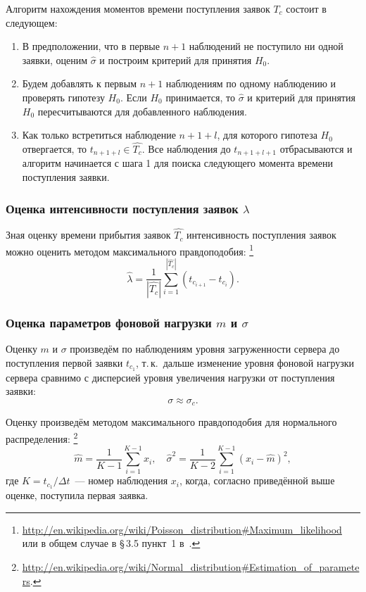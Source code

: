\documentclass[a4paper,10pt]{article}
\begin{document}
Алгоритм нахождения моментов времени поступления заявок $T_c$ 
состоит в следующем:
\begin{enumerate}
  \item В предположении, что в первые $n+1$ наблюдений не поступило ни одной 
  заявки, оценим $\widehat{\sigma}$ и построим критерий для принятия $H_0$.
  \item Будем добавлять к первым $n+1$ наблюдениям по одному наблюдению и 
  проверять гипотезу $H_0$.
  Если $H_0$ принимается, то $\widehat{\sigma}$ и критерий для принятия $H_0$ 
  пересчитываются для добавленного наблюдения.
  \item Как только встретиться наблюдение $n+1+l$, для которого гипотеза $H_0$
  отвергается, то \mbox{$t_{n+1+l} \in \widehat{T_c}$}. 
  Все наблюдения до $t_{n+1+l+1}$ отбрасываются и алгоритм начинается с шага 1
  для поиска следующего момента времени поступления заявки.
\end{enumerate}

\subsubsection{Оценка интенсивности поступления заявок $\lambda$}%
\label{lc0-iter-lambda}
Зная оценку времени прибытия заявок $\widehat{T_c}$ 
интенсивность поступления заявок можно оценить
методом максимального правдоподобия:%
\footnote{{\url{http://en.wikipedia.org/wiki/Poisson\_distribution\#Maximum\_likelihood}} 
или в общем случае в \S\,3.5 пункт~1 в~\cite{ivchmed2010matstat}.}
$$\widehat{\lambda} = 
    \frac{1}{|\widehat{T_c}|} 
        \sum\limits_{i=1}^{|\widehat{T_c}|} (t_{c_{i+1}} - t_{c_i}).$$

\subsubsection{Оценка параметров фоновой нагрузки $m$ и $\sigma$}%
\label{lc0-m-sigma}
Оценку $m$ и $\sigma$ произведём по наблюдениям уровня загруженности 
сервера до поступления первой заявки $t_{c_1}$, 
т.\,к.~дальше изменение уровня фоновой нагрузки сервера сравнимо с дисперсией 
уровня увеличения нагрузки от поступления заявки: 
$$\sigma \approx \sigma_c.$$

Оценку произведём методом максимального правдоподобия для нормального 
распределения:%
\footnote{{\url{http://en.wikipedia.org/wiki/Normal\_distribution\#Estimation_of_parameters}}.} 
$$
  \widehat{m} = \frac{1}{K-1} \sum\limits_{i=1}^{K-1} x_i, \quad
  \widehat{\sigma}^2 = 
      \frac{1}{K-2} \sum\limits_{i=1}^{K-1} (x_i - \widehat{m})^2,
$$
где $K = t_{c_1} / \Delta t$~--- 
номер наблюдения $x_i$, когда, согласно приведённой выше оценке,
поступила первая заявка.
\end{document}
